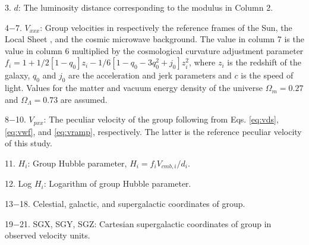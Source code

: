 \documentclass[twocolumn]{aastex63}
\begin{document}
3. $d$: The luminosity distance corresponding to the modulus in Column 2.

4$-$7. $V_{xxx}$: Group velocities in respectively the reference frames of the Sun, the Local Sheet \citep{2008ApJ...676..184T}, and the cosmic microwave background. The value in column 7 is the value in column 6 multiplied by the cosmological curvature adjustment parameter $f_i = 1+1/2[1-q_{0}]z_{i}-1/6[1-q_{0}-3q^{2}_{0}+j_{0}]z_{i}^{2}$, where $z_{i}$ is the redshift of the galaxy, $q_{0}$ and $j_{0}$ are the acceleration and jerk parameters and $c$ is the speed of light.  Values for the matter and vacuum energy density of the universe $\Omega_m=0.27$ and $\Omega_{\Lambda}=0.73$ are assumed.

8$-$10. $V_{pxx}$: The peculiar velocity of the group following from Eqs. \ref{eq:vds}, \ref{eq:vwf}, and \ref{eq:vramp}, respectively.  The latter is the reference peculiar velocity of this study.

11. $H_i$: Group Hubble parameter, $H_i = f_iV_{cmb,i}/d_i$.

12. Log $H_i$: Logarithm of group Hubble parameter.

13$-$18. Celestial, galactic, and supergalactic coordinates of group.

19$-$21. SGX, SGY, SGZ: Cartesian supergalactic coordinates of group in observed velocity units.
\end{document}
